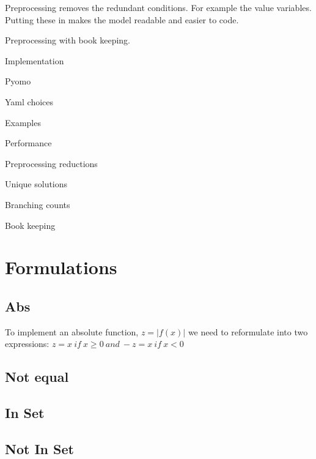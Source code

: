 \documentclass{article}
\begin{document}
Preprocessing removes the redundant conditions. For example the value variables.  Putting these in makes the model readable and easier to code. 

Preprocessing with book keeping. 


Implementation

Pyomo

Yaml choices

Examples

Performance

Preprocessing reductions

Unique solutions

Branching counts
  
Book keeping



\section{Formulations}

\subsection{Abs}

To implement an absolute function, \( z=|f(x)| \) we need to reformulate into two expressions: \( z = x \: if \: x \geq 0\: and \: -z=x\: if \: x< 0 \)

\subsection{Not equal}

\subsection{In Set}

\subsection{Not In Set}
\end{document}
